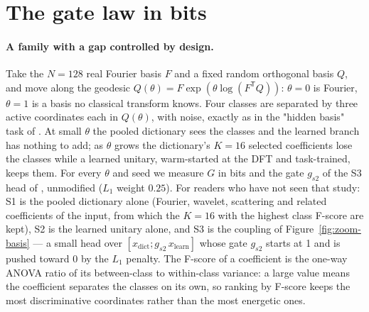 \documentclass[11pt,a4paper]{article}
\begin{document}
\section{The gate law in bits}\label{sec:gaplaw}
\paragraph{A family with a gap controlled by design.} Take the $N=128$ real Fourier basis $F$ and a fixed random orthogonal basis $Q$, and move along the geodesic $Q(\theta) = F\exp(\theta\log(F^{\mathsf T}Q))$: $\theta=0$ is Fourier, $\theta=1$ is a basis no classical transform knows. Four classes are separated by three active coordinates each in $Q(\theta)$, with noise, exactly as in the "hidden basis" task of \cite{flob}. At small $\theta$ the pooled dictionary sees the classes and the learned branch has nothing to add; as $\theta$ grows the dictionary's $K=16$ selected coefficients lose the classes while a learned unitary, warm-started at the DFT and task-trained, keeps them. For every $\theta$ and seed we measure $G$ in bits and the gate $g_{s2}$ of the S3 head of \cite{flob}, unmodified ($L_1$ weight $0.25$). For readers who have not seen that study: S1 is the pooled dictionary alone (Fourier, wavelet, scattering and related coefficients of the input, from which the $K=16$ with the highest class F-score are kept), S2 is the learned unitary alone, and S3 is the coupling of Figure~\ref{fig:zoom-basis} — a small head over $[x_{\mathrm{dict}}; g_{s2}\,x_{\mathrm{learn}}]$ whose gate $g_{s2}$ starts at 1 and is pushed toward 0 by the $L_1$ penalty. The F-score of a coefficient is the one-way ANOVA ratio of its between-class to within-class variance: a large value means the coefficient separates the classes on its own, so ranking by F-score keeps the most discriminative coordinates rather than the most energetic ones.
\end{document}
